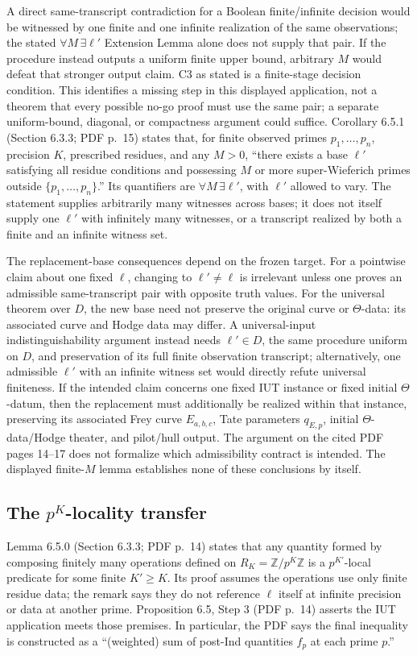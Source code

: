 \documentclass[11pt]{article}
\begin{document}
A direct same-transcript contradiction for a Boolean finite/infinite decision would be witnessed by one finite and one infinite realization of the same observations; the stated $\forall M\,\exists\ell'$ Extension Lemma alone does not supply that pair. If the procedure instead outputs a uniform finite upper bound, arbitrary $M$ would defeat that stronger output claim. C3 as stated is a finite-stage decision condition. This identifies a missing step in this displayed application, not a theorem that every possible no-go proof must use the same pair; a separate uniform-bound, diagonal, or compactness argument could suffice. Corollary 6.5.1 (Section 6.3.3; PDF p.~15) states that, for finite observed primes $p_1,\ldots,p_n$, precision $K$, prescribed residues, and any $M>0$, ``there exists a base $\ell'$ satisfying all residue conditions and possessing $M$ or more super-Wieferich primes outside $\{p_1,\ldots,p_n\}$.'' Its quantifiers are $\forall M\,\exists\ell'$, with $\ell'$ allowed to vary. The statement supplies arbitrarily many witnesses across bases; it does not itself supply one $\ell'$ with infinitely many witnesses, or a transcript realized by both a finite and an infinite witness set.

The replacement-base consequences depend on the frozen target. For a pointwise claim about one fixed $\ell$, changing to $\ell'\ne\ell$ is irrelevant unless one proves an admissible same-transcript pair with opposite truth values. For the universal theorem over $D$, the new base need not preserve the original curve or $\Theta$-data: its associated curve and Hodge data may differ. A universal-input indistinguishability argument instead needs $\ell'\in D$, the same procedure uniform on $D$, and preservation of its full finite observation transcript; alternatively, one admissible $\ell'$ with an infinite witness set would directly refute universal finiteness. If the intended claim concerns one fixed IUT instance or fixed initial $\Theta$-datum, then the replacement must additionally be realized within that instance, preserving its associated Frey curve $E_{a,b,c}$, Tate parameters $q_{E,p}$, initial $\Theta$-data/Hodge theater, and pilot/hull output. The argument on the cited PDF pages 14--17 does not formalize which admissibility contract is intended. The displayed finite-$M$ lemma establishes none of these conclusions by itself.

\subsection{The $p^K$-locality transfer}
Lemma 6.5.0 (Section 6.3.3; PDF p.~14) states that any quantity formed by composing finitely many operations defined on $R_K=\mathbb Z/p^K\mathbb Z$ is a $p^{K'}$-local predicate for some finite $K'\geq K$. Its proof assumes the operations use only finite residue data; the remark says they do not reference $\ell$ itself at infinite precision or data at another prime. Proposition 6.5, Step 3 (PDF p.~14) asserts the IUT application meets those premises. In particular, the PDF says the final inequality is constructed as a ``(weighted) sum of post-Ind quantities $f_p$ at each prime $p$.''
\end{document}
